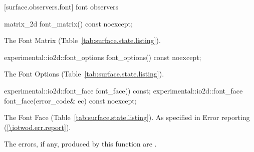  [surface.observers.font] { font observers}

\begin{itemdecl}
matrix_2d font_matrix() const noexcept;
\end{itemdecl}
\begin{itemdescr}
\pnum
\returns
The Font Matrix (Table~\ref{tab:surface.state.listing}).
\end{itemdescr}

\begin{itemdecl}
experimental::io2d::font_options font_options() const noexcept;
\end{itemdecl}
\begin{itemdescr}
\pnum
\returns
The Font Options (Table~\ref{tab:surface.state.listing}).
\end{itemdescr}

\begin{itemdecl}
experimental::io2d::font_face font_face() const;
experimental::io2d::font_face font_face(error_code& ec) const noexcept;
\end{itemdecl}
\begin{itemdescr}
\pnum
\returns
The Font Face (Table~\ref{tab:surface.state.listing}).
\pnum
\throws
As specified in Error reporting (\ref{\iotwod.err.report}).

\pnum
\errors
The errors, if any, produced by this function are .
\end{itemdescr}
